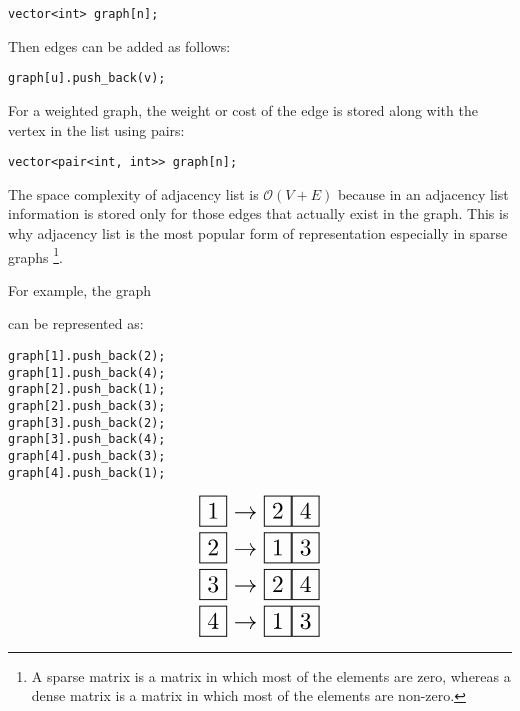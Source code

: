 \documentclass[twoside,12pt,a4paper,english]{book}
\theoremstyle{definition}
\theoremstyle{problemstyle}
\begin{document}
\begin{lstlisting}
vector<int> graph[n];
\end{lstlisting}

Then edges can be added as follows:

\begin{lstlisting}
graph[u].push_back(v);
\end{lstlisting}

For a weighted graph, the weight or cost of the edge is stored along with the vertex in the list using pairs:

\begin{lstlisting}
vector<pair<int, int>> graph[n];
\end{lstlisting}

The space complexity of adjacency list is $\mathcal{O}(V + E)$ because in an adjacency list information is stored only for those edges that actually exist in the graph. This is why adjacency list is the most popular form of representation especially in sparse graphs \footnote{A sparse matrix is a matrix in which most of the elements are zero, whereas a dense matrix is a matrix in which most of the elements are non-zero.}.

For example, the graph

\begin{center}
\end{center}

can be represented as:
\begin{lstlisting}
graph[1].push_back(2);
graph[1].push_back(4);
graph[2].push_back(1);
graph[2].push_back(3);
graph[3].push_back(2);
graph[3].push_back(4);
graph[4].push_back(3);
graph[4].push_back(1);
\end{lstlisting}

\begin{align*}
\resizebox{0.25\hsize}{!}{$\fbox{1}\rightarrow\fbox{2}\fbox{4}$}\\
\resizebox{0.25\hsize}{!}{$\fbox{2}\rightarrow\fbox{1}\fbox{3}$}\\
\resizebox{0.25\hsize}{!}{$\fbox{3}\rightarrow\fbox{2}\fbox{4}$} \\
\resizebox{0.25\hsize}{!}{$\fbox{4}\rightarrow\fbox{1}\fbox{3}$}
\end{align*}
\end{document}
